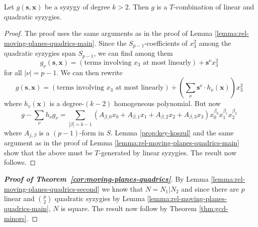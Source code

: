 \documentclass[fleqn,reqno]{amsart}
\begin{document}
\begin{lemma}
\label{lemma:rel-moving-planes-quadrics-second}
Let $g(\mathbf s, \mathbf x)$ be a syzygy of degree $k>2$.
Then $g$ is a $T$-combination of linear and quadratic syzygies.
\end{lemma}

\begin{proof}
The proof uses the same arguments as in the proof of Lemma \ref{lemma:rel-moving-planes-quadrics-main}.
Since the $S_{p-1}$-coefficients of $x_3^2$ among the quadratic syzygies span $S_{p-1}$,
we can find among them
\[
	g_\nu(\mathbf s,\mathbf x)=(\text{terms involving $x_3$ at most linearly})+{\mathbf s}^\nu x_3^2
\]
for all $|\nu|=p-1$. We can then rewrite
\[
	g(\mathbf s,\mathbf x)=(\text{terms involving $x_3$ at most linearly})+(\sum_\nu {\mathbf s}^\nu\cdot h_\nu(\mathbf x))x_3^2
\]
where $h_v(\mathbf x)$ is a degree-$(k-2)$ homogeneous polynomial. But now
\[
	g-\sum_\nu h_\nu g_\nu=\sum_{|\beta|=k-1} (A_{\beta,0}x_0+A_{\beta,1}x_1+A_{\beta,2}x_2+A_{\beta,3}x_3) x_0^{\beta_0}x_1^{\beta_1}x_2^{\beta_2}
\]
where $A_{j,\beta}$ is a $(p-1)$-form in $S$.
Lemma \ref{prop:key-koszul} and the same argument as in the proof of Lemma \ref{lemma:rel-moving-planes-quadrics-main}
show that the above must be $T$-generated by linear syzygies.
The result now follows.
\end{proof}

\begin{proof}[\bf Proof of Theorem~\ref{cor:moving-planes-quadrics}]
By Lemma \ref{lemma:rel-moving-planes-quadrics-second} we know that $N=N_1|N_2$
and since there are $p$ linear and $\binom{p}{2}$ quadratic syzygies
by Lemma \ref{lemma:rel-moving-planes-quadrics-main}, $N$ is square.
The result now follow by Theorem \ref{thm:gcd-minors}.
\end{proof}




\end{document}
